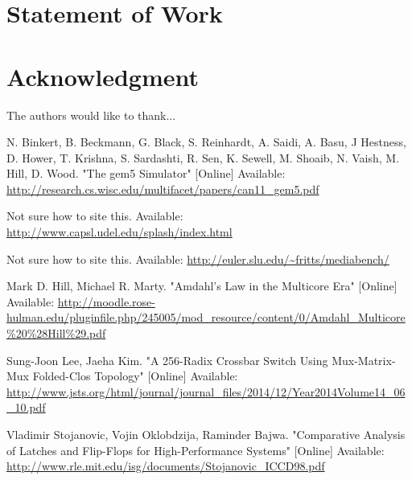 \documentclass[journal]{IEEEtran}
\begin{document}
\section{Statement of Work}



\section*{Acknowledgment}
The authors would like to thank...

\begin{thebibliography}{1}
    N. Binkert, B. Beckmann, G. Black, S. Reinhardt, A. Saidi, A. Basu, J Hestness, D. Hower, T. Krishna, S. Sardashti, R. Sen, K. Sewell, M. Shoaib, N. Vaish, M. Hill, D. Wood. "The gem5 Simulator" [Online]
    Available: \url{http://research.cs.wisc.edu/multifacet/papers/can11_gem5.pdf}

    Not sure how to site this.
    Available: \url{http://www.capsl.udel.edu/splash/index.html}

    Not sure how to site this.
    Available: \url{http://euler.slu.edu/~fritts/mediabench/}

    Mark D. Hill, Michael R. Marty. "Amdahl’s Law in the Multicore Era" [Online]
    Available: \url{http://moodle.rose-hulman.edu/pluginfile.php/245005/mod_resource/content/0/Amdahl_Multicore%20%28Hill%29.pdf}

    Sung-Joon Lee, Jaeha Kim. "A 256-Radix Crossbar Switch Using Mux-Matrix-Mux Folded-Clos Topology" [Online]
    Available: \url{http://www.jsts.org/html/journal/journal_files/2014/12/Year2014Volume14_06_10.pdf}

    Vladimir Stojanovic, Vojin Oklobdzija, Raminder Bajwa. "Comparative Analysis of Latches and Flip-Flops for High-Performance Systems" [Online]
    Available: \url{http://www.rle.mit.edu/isg/documents/Stojanovic_ICCD98.pdf}
\end{thebibliography}

\end{document}
